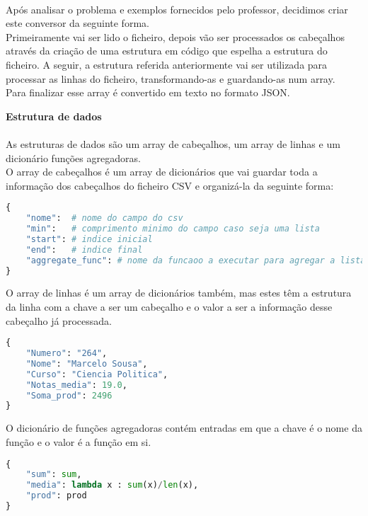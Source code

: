 \documentclass[11pt,a4paper]{report}
\begin{document}
\paragraph{}
Após analisar o problema e exemplos fornecidos pelo professor, decidimos criar este conversor da seguinte forma. \\
Primeiramente vai ser lido o ficheiro, depois vão ser processados os cabeçalhos através da criação de uma estrutura em código que espelha a estrutura do ficheiro. A seguir, a estrutura referida anteriormente vai ser utilizada para processar as linhas do ficheiro, transformando-as e guardando-as num array.\\
Para finalizar esse array é convertido em texto no formato JSON.\\

\item\textbf{Estrutura de dados}
\paragraph{}
As estruturas de dados são um array de cabeçalhos,  um array de linhas e um dicionário funções agregadoras. \\
O array de cabeçalhos é um array de dicionários que vai guardar toda a informação dos cabeçalhos do  
ficheiro CSV e organizá-la da seguinte forma: \\
\begin{lstlisting}[language=Python]
{
    "nome":  # nome do campo do csv
    "min":   # comprimento minimo do campo caso seja uma lista
    "start": # indice inicial
    "end":   # indice final
    "aggregate_func": # nome da funcaoo a executar para agregar a lista
}
\end{lstlisting}

O array de linhas é um array de dicionários também, mas estes têm a estrutura da linha com a chave a ser um cabeçalho e o valor a ser a informação desse cabeçalho já processada.  \\
\begin{lstlisting}[language=Python]
{
    "Numero": "264",
    "Nome": "Marcelo Sousa",
    "Curso": "Ciencia Politica",
    "Notas_media": 19.0,
    "Soma_prod": 2496
}
\end{lstlisting}

O dicionário de funções agregadoras contém entradas em que a chave é o nome da função e o valor é a função em si. 

\begin{lstlisting}[language=Python]
{
    "sum": sum,
    "media": lambda x : sum(x)/len(x),
    "prod": prod
}
\end{lstlisting}
\end{document}
